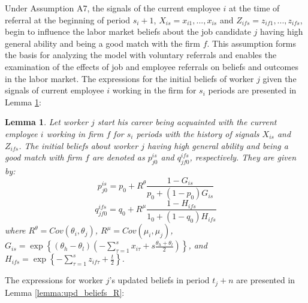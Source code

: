 \documentclass[12pt]{article}
\newtheorem{lemma}{Lemma}
\begin{document}
Under Assumption A7, the signals of the current employee $i$ at the time of referral at the beginning of period $s_i+1$, $X_{is} = {x_{i1}, ..., x_{is}}$ and $Z_{ifs} = {z_{if1}, ..., z_{ifs}}$, begin to influence the labor market beliefs about the job candidate $j$ having high general ability and being a good match with the firm $f$. This assumption forms the basis for analyzing the model with voluntary referrals and enables the examination of the effects of job and employee referrals on beliefs and outcomes in the labor market. The expressions for the initial beliefs of worker $j$ given the signals of current employee $i$ working in the firm for $s_i$ periods are presented in Lemma \ref{lemma:init_beliefs_R}:

\begin{lemma}\label{lemma:init_beliefs_R}
Let worker $j$ start his career being acquainted with the current employee $i$ working in firm $f$ for $s_i$ periods with the history of signals $X_{is}$ and $Z_{ifs}$. The initial beliefs about worker $j$ having high general ability and being a good match with firm $f$ are denoted as $p_{j0}^{is}$ and $q_{jf0}^{ifs}$, respectively. They are given by:
    \begin{equation}\label{eq:p_j0_is}
    p_{j0}^{is} = p_0 + R^\theta \frac{1-G_{is}}{p_0 + (1-p_0)G_{is}}
    \end{equation}
    \begin{equation}
        q_{jf0}^{ifs} = q_0 + R^\mu \frac{1-H_{ifs}}{1_0 + (1-q_0)H_{ifs}}
    \end{equation}\label{eq:q_j0_is}
    where $R^\theta = Cov(\theta_i, \theta_j)$, $R^\mu = Cov(\mu_i, \mu_j)$, $G_{is} = \exp \left\lbrace (\theta_h - \theta_l)(-\sum_{\tau = 1}^{s}x_{i\tau} + s\frac{\theta_h + \theta_l}{2}) \right \rbrace$, and $H_{ifs} = \exp \left\lbrace -\sum_{\tau = 1}^{s}z_{if\tau}+\frac{t}{2}\right\rbrace$.
\end{lemma}

The expressions for worker $j$'s updated beliefs in period $t_j+n$ are presented in Lemma \ref{lemma:upd_beliefs_R}:
\end{document}
